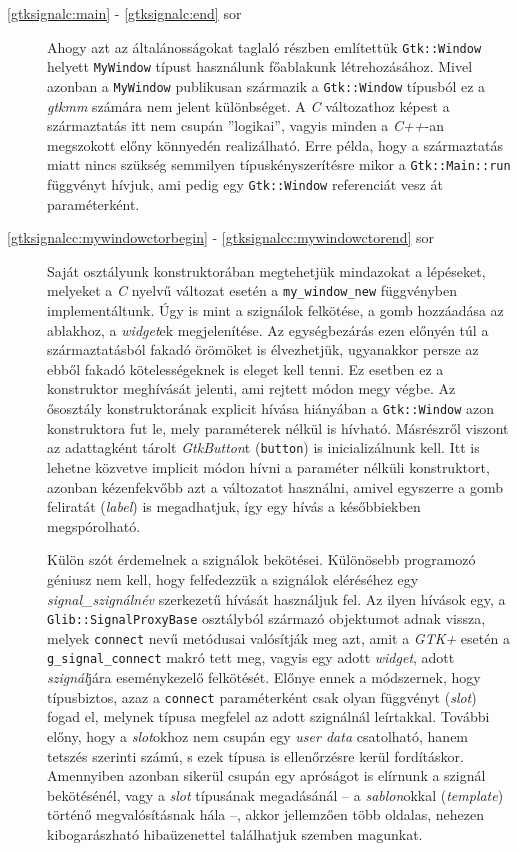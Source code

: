 \begin{description}
 \item[\ref{gtksignalc:main} - \ref{gtksignalc:end} sor] Ahogy azt az általánosságokat taglaló részben említettük \texttt{Gtk::Window} helyett \texttt{MyWindow} típust használunk főablakunk létrehozásához. Mivel azonban a \texttt{MyWindow} publikusan származik a \texttt{Gtk::Window} típusból ez a \textit{gtkmm} számára nem jelent különbséget. A \textit{C} változathoz képest a származtatás itt nem csupán ''logikai'', vagyis minden a \textit{C++}-an megszokott előny könnyedén realizálható. Erre példa, hogy a származtatás miatt nincs szükség semmilyen típuskényszerítésre mikor a \texttt{Gtk::Main::run} függvényt hívjuk, ami pedig egy \texttt{Gtk::Window} referenciát vesz át paraméterként.

 \item[\ref{gtksignalcc:mywindowctorbegin} - \ref{gtksignalcc:mywindowctorend} sor] Saját osztályunk konstruktorában megtehetjük mindazokat a lépéseket, melyeket a \textit{C} nyelvű változat esetén a \texttt{my\_window\_new} függvényben implementáltunk. Úgy is mint a szignálok felkötése, a gomb hozzáadása az ablakhoz, a \textit{widget}ek megjelenítése. Az egységbezárás ezen előnyén túl a származtatásból fakadó örömöket is élvezhetjük, ugyanakkor persze az ebből fakadó kötelességeknek is eleget kell tenni. Ez esetben ez a konstruktor meghívását jelenti, ami rejtett módon megy végbe. Az ősosztály konstruktorának explicit hívása hiányában a \texttt{Gtk::Window} azon konstruktora fut le, mely paraméterek nélkül is hívható. Másrészről viszont az adattagként tárolt \textit{GtkButton}t (\texttt{button}) is inicializálnunk kell. Itt is lehetne közvetve implicit módon hívni a paraméter nélküli konstruktort, azonban kézenfekvőbb azt a változatot használni, amivel egyszerre a gomb feliratát (\textit{label}) is megadhatjuk, így egy hívás a későbbiekben megspórolható.

Külön szót érdemelnek a szignálok bekötései. Különösebb programozó géniusz nem kell, hogy felfedezzük a szignálok eléréséhez egy \textit{signal\_}\textit{szignálnév} szerkezetű hívását használjuk fel. Az ilyen hívások egy, a \texttt{Glib::SignalProxyBase} osztályból származó objektumot adnak vissza, melyek \texttt{connect} nevű metódusai valósítják meg azt, amit a \textit{GTK+} esetén a \texttt{g\_signal\_connect} makró tett meg, vagyis egy adott \textit{widget}, adott \textit{szignál}jára eseménykezelő felkötését. Előnye ennek a módszernek, hogy típusbiztos, azaz a \texttt{connect} paraméterként csak olyan függvényt (\textit{slot}) fogad el, melynek típusa megfelel az adott szignálnál leírtakkal. További előny, hogy a \textit{slot}okhoz nem csupán egy \textit{user data} csatolható, hanem tetszés szerinti számú, s ezek típusa is ellenőrzésre kerül fordításkor. Amennyiben azonban sikerül csupán egy apróságot is elírnunk a szignál bekötésénél, vagy a \textit{slot} típusának megadásánál -- a \textit{sablon}okkal (\textit{template}) történő megvalósításnak hála --, akkor jellemzően több oldalas, nehezen kibogarászható hibaüzenettel találhatjuk szemben magunkat.


\end{description}
